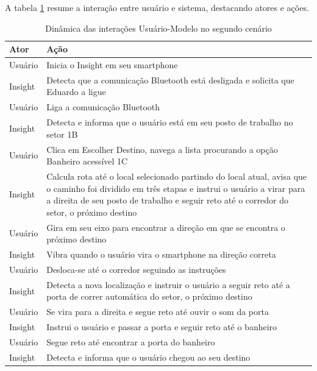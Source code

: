 \documentclass[twoside,english,brazilian]{UNISINOSartigo}
\begin{document}
A tabela \ref{tab:cenario2} resume a interação entre usuário e sistema, destacando atores e ações.

\begin{table}
	\caption{Dinâmica das interações Usuário-Modelo no segundo cenário}
	\label{tab:cenario2}
	\centering%
	\begin{minipage}{1\textwidth}
		\begin{adjustbox}{max width=\textwidth}
			\begin{tabular}{ p{} | p{14cm} }
				\hline
			 	\textbf{Ator} & \textbf{Ação}\\
				\hline
Usuário & Inicia o Insight em seu smartphone \\
Insight & Detecta que a comunicação Bluetooth está desligada e solicita que Eduardo a ligue \\
Usuário & Liga a comunicação Bluetooth \\
Insight & Detecta e informa que o usuário está em seu posto de trabalho no setor 1B \\
Usuário & Clica em Escolher Destino, navega a lista procurando a opção Banheiro acessível 1C \\
Insight & Calcula rota até o local selecionado partindo do local atual, avisa que o caminho foi dividido em três etapas e instrui o usuário a virar para a direita de seu posto de trabalho e seguir reto até o corredor do setor, o próximo destino \\
Usuário & Gira em seu eixo para encontrar a direção em que se encontra o próximo destino \\
Insight & Vibra quando o usuário vira o smartphone na direção correta \\
Usuário & Desloca-se até o corredor seguindo as instruções \\
Insight & Detecta a nova localização e instruir o usuário a seguir reto até a porta de correr automática do setor, o próximo destino \\
Usuário & Se vira para a direita e segue reto até ouvir o som da porta \\
Insight & Instrui o usuário e passar a porta e seguir reto até o banheiro \\
Usuário & Segue reto até encontrar a porta do banheiro \\
Insight & Detecta e informa que o usuário chegou ao seu destino \\


\end{tabular}
\end{adjustbox}
\end{minipage}
\end{table}
\end{document}
